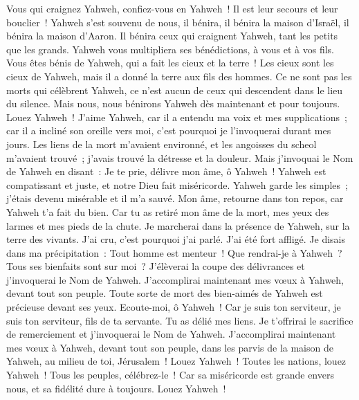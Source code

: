 \begin{multicols}{2}
Vous qui craignez Yahweh, confiez-vous en Yahweh~! Il est leur secours et leur bouclier~!
Yahweh s'est souvenu de nous, il bénira, il bénira la maison d'Israël, il bénira la maison d'Aaron.
Il bénira ceux qui craignent Yahweh, tant les petits que les grands.
Yahweh vous multipliera ses bénédictions, à vous et à vos fils.
Vous êtes bénis de Yahweh, qui a fait les cieux et la terre~!
Les cieux sont les cieux de Yahweh, mais il a donné la terre aux fils des hommes.
Ce ne sont pas les morts qui célèbrent Yahweh, ce n'est aucun de ceux qui descendent dans le lieu du silence.
Mais nous, nous bénirons Yahweh dès maintenant et pour toujours. Louez Yahweh~!
\VerseOne{}J'aime Yahweh, car il a entendu ma voix et mes supplications~;
car il a incliné son oreille vers moi, c'est pourquoi je l'invoquerai durant mes jours.
Les liens de la mort m'avaient environné, et les angoisses du scheol m'avaient trouvé~; j'avais trouvé la détresse et la douleur.
Mais j'invoquai le Nom de Yahweh en disant~: Je te prie, délivre mon âme, ô Yahweh~!
Yahweh est compatissant et juste, et notre Dieu fait miséricorde.
Yahweh garde les simples~; j'étais devenu misérable et il m'a sauvé.
Mon âme, retourne dans ton repos, car Yahweh t'a fait du bien.
Car tu as retiré mon âme de la mort, mes yeux des larmes et mes pieds de la chute.
Je marcherai dans la présence de Yahweh, sur la terre des vivants.
J'ai cru, c'est pourquoi j'ai parlé. J'ai été fort affligé.
Je disais dans ma précipitation~: Tout homme est menteur~!
Que rendrai-je à Yahweh~? Tous ses bienfaits sont sur moi~?
J'élèverai la coupe des délivrances et j'invoquerai le Nom de Yahweh.
J'accomplirai maintenant mes vœux à Yahweh, devant tout son peuple.
Toute sorte de mort des bien-aimés de Yahweh est précieuse devant ses yeux.
Ecoute-moi, ô Yahweh~! Car je suis ton serviteur, je suis ton serviteur, fils de ta servante. Tu as délié mes liens.
Je t'offrirai le sacrifice de remerciement et j'invoquerai le Nom de Yahweh.
J'accomplirai maintenant mes vœux à Yahweh, devant tout son peuple,
dans les parvis de la maison de Yahweh, au milieu de toi, Jérusalem~! Louez Yahweh~!
\VerseOne{}Toutes les nations, louez Yahweh~! Tous les peuples, célébrez-le~!
Car sa miséricorde est grande envers nous, et sa fidélité dure à toujours. Louez Yahweh~!

\end{multicols}
